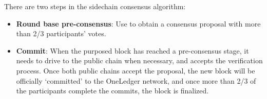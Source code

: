 \noindent There are two steps in the sidechain consensus algorithm:
\begin{itemize}
    \item \textbf{Round base pre-consensus}: Use to obtain a consensus proposal with more than 2/3 participants' votes.
    \item \textbf{Commit}: When the purposed block has reached a pre-consensus stage, it needs to drive to the public chain when necessary, and accepts the verification process. Once both public chains accept the proposal, the new block will be officially `committed' to the OneLedger network, and once more than 2/3 of the participants complete the commits, the block is finalized. 
\end{itemize}